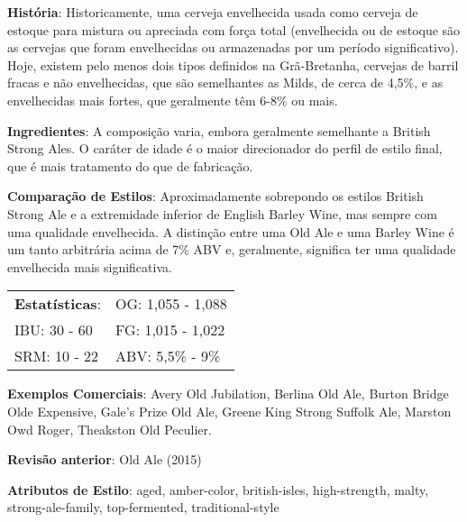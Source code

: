 \textbf{História}: Historicamente, uma cerveja envelhecida usada como cerveja de estoque para mistura ou apreciada com força total (envelhecida ou de estoque são as cervejas que foram envelhecidas ou armazenadas por um período significativo). Hoje, existem pelo menos dois tipos definidos na Grã-Bretanha, cervejas de barril fracas e não envelhecidas, que são semelhantes as Milds, de cerca de 4,5\%, e as envelhecidas mais fortes, que geralmente têm 6-8\% ou mais.

\textbf{Ingredientes}: A composição varia, embora geralmente semelhante a British Strong Ales. O caráter de idade é o maior direcionador do perfil de estilo final, que é mais tratamento do que de fabricação.

\textbf{Comparação de Estilos}: Aproximadamente sobrepondo os estilos British Strong Ale e a extremidade inferior de English Barley Wine, mas sempre com uma qualidade envelhecida. A distinção entre uma Old Ale e uma Barley Wine é um tanto arbitrária acima de 7\% ABV e, geralmente, significa ter uma qualidade envelhecida mais significativa.

\begin{tabular}{@{}p{35mm}p{35mm}@{}}
  \textbf{Estatísticas}: & OG: 1,055 - 1,088 \\
  IBU: 30 - 60  & FG: 1,015 - 1,022  \\
  SRM: 10 - 22  & ABV: 5,5\% - 9\%
\end{tabular}

\textbf{Exemplos Comerciais}: Avery Old Jubilation, Berlina Old Ale, Burton Bridge Olde Expensive, Gale’s Prize Old Ale, Greene King Strong Suffolk Ale, Marston Owd Roger, Theakston Old Peculier.

\textbf{Revisão anterior}: Old Ale (2015)

\textbf{Atributos de Estilo}: aged, amber-color, british-isles, high-strength, malty, strong-ale-family, top-fermented, traditional-style